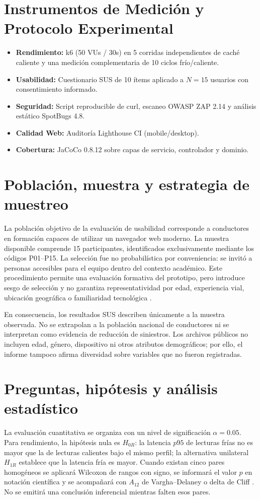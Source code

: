 \documentclass[11pt,a4paper]{report}
\begin{document}
\section{Instrumentos de Medición y Protocolo Experimental}
\begin{itemize}
    \item \textbf{Rendimiento:} k6 (50 VUs / 30s) en 5 corridas independientes de caché caliente y una medición complementaria de 10 ciclos frío/caliente.
    \item \textbf{Usabilidad:} Cuestionario SUS de 10 ítems \cite{brooke1996sus} aplicado a $N = 15$ usuarios con consentimiento informado.
    \item \textbf{Seguridad:} Script reproducible de curl, escaneo OWASP ZAP 2.14 y análisis estático SpotBugs 4.8.
    \item \textbf{Calidad Web:} Auditoría Lighthouse CI (mobile/desktop).
    \item \textbf{Cobertura:} JaCoCo 0.8.12 sobre capas de servicio, controlador y dominio.
\end{itemize}

\section{Población, muestra y estrategia de muestreo}
La población objetivo de la evaluación de usabilidad corresponde a conductores en formación capaces de utilizar un navegador web moderno. La muestra disponible comprende 15 participantes, identificados exclusivamente mediante los códigos P01--P15. La selección fue no probabilística por conveniencia: se invitó a personas accesibles para el equipo dentro del contexto académico. Este procedimiento permite una evaluación formativa del prototipo, pero introduce sesgo de selección y no garantiza representatividad por edad, experiencia vial, ubicación geográfica o familiaridad tecnológica \cite{baltes2022sampling}.

En consecuencia, los resultados SUS describen únicamente a la muestra observada. No se extrapolan a la población nacional de conductores ni se interpretan como evidencia de reducción de siniestros. Los archivos públicos no incluyen edad, género, dispositivo ni otros atributos demográficos; por ello, el informe tampoco afirma diversidad sobre variables que no fueron registradas.

\section{Preguntas, hipótesis y análisis estadístico}
La evaluación cuantitativa se organiza con un nivel de significación $\alpha=0.05$. Para rendimiento, la hipótesis nula es $H_{0R}$: la latencia $p95$ de lecturas frías no es mayor que la de lecturas calientes bajo el mismo perfil; la alternativa unilateral $H_{1R}$ establece que la latencia fría es mayor. Cuando existan cinco pares homogéneos se aplicará Wilcoxon de rangos con signo, se informará el valor $p$ en notación científica y se acompañará con $A_{12}$ de Vargha--Delaney o delta de Cliff \cite{arcuri2012hitchhiker,vargha2000critique,cliff1993dominance}. No se emitirá una conclusión inferencial mientras falten esos pares.
\end{document}
